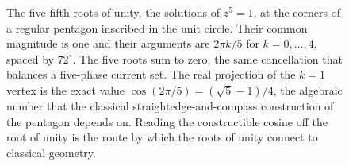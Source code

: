 \begin{figure}[htbp]
\centering
{}
\caption[The five fifth-roots of unity]{The five fifth-roots of unity, the
solutions of $z^{5} = 1$, at the corners of a regular pentagon inscribed in
the unit circle. Their common magnitude is one and their arguments are
$2\pi k/5$ for $k = 0,\dots,4$, spaced by $72^{\circ}$. The five roots sum to
zero, the same cancellation that balances a five-phase current set. The real
projection of the $k = 1$ vertex is the exact value
$\cos(2\pi/5) = (\sqrt{5} - 1)/4$, the algebraic number that the classical
straightedge-and-compass construction of the pentagon depends on. Reading the
constructible cosine off the root of unity is the route by which the roots of
unity connect to classical geometry.}
\label{fig:vol02ch03:fifth-roots}
\end{figure}
